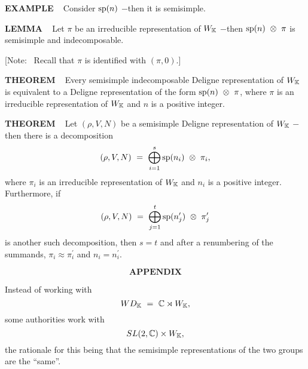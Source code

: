 \vspace{0.1cm}

\begin{x}{\small\bf EXAMPLE} \ %
Consider $\text{sp}(n)$ $-$then it is semisimple.
\end{x}

\vspace{0.1cm}

\begin{x}{\small\bf LEMMA} \ %
Let $\pi$ be an irreducible representation of $W_{\mathbb{K}}$  $-$then $\text{sp}(n) \ \otimes \  \pi$ is semisimple and indecomposable.  

[Note: \ 
Recall that $\pi$ is identified with $(\pi,0)$.]
\end{x}

\vspace{0.1cm}

\begin{x}{\small\bf THEOREM} \ %
Every semisimple indecomposable Deligne representation of $W_{\mathbb{K}}$  is equivalent to a Deligne representation of the form 
$\text{sp}(n) \ \otimes \  \pi$, where $\pi$ is an irreducible representation of $W_{\mathbb{K}}$ and $n$ is a positive integer. 
\end{x}

\vspace{0.1cm}

\begin{x}{\small\bf THEOREM} \ %
Let $(\rho,V,N)$ be a semisimple Deligne representation of $W_{\mathbb{K}}$ $-$then there is a decomposition 
\[
(\rho,V,N) \ = \ \bigoplus\limits_{i= 1}^{s} \spp(n_i) \ \otimes \ \pi_i,
\]
where $\pi_i$ is an irreducible representation of $W_{\mathbb{K}}$ and $n_i$ is a positive integer.  
Furthermore, if  
\[
(\rho,V,N) \ = \ \bigoplus\limits_{j = 1}^t \text{sp}(n_j^\prime) \  \otimes \  \pi_j^\prime
\]
is another such decomposition, then $s = t$ and after a renumbering of the summands, 
$\pi_i \approx \pi_i^\prime$ and $n_i = n_i^\prime$.
\end{x}

\vspace{0.1cm}


\[
\textbf{APPENDIX}
\]
\setcounter{theoremn}{0}

Instead of working with 
\[
WD_{\mathbb{K}} \ = \ \mathbb{C} \rtimes W_{\mathbb{K}},
\]
some authorities work with 
\[
SL(2,\mathbb{C}) \times W_{\mathbb{K}},
\]
the rationale for this being that the semisimple representations of the two groups are the ``same''.

